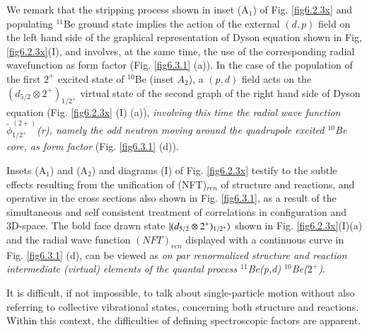   
  We remark that  the stripping process shown in inset
  (A$_1$) of Fig. \ref{fig6.2.3x} and populating $^{11}$Be ground state  implies the action of
  the external $(d,p)$ field on the left hand side of the graphical representation of Dyson equation shown in Fig, 
  \ref{fig6.2.3x}(I), and involves, at the same time, the use of the corresponding radial wavefunction
  as form factor (Fig. \ref{fig6.3.1} (a)). 
  In the case of the population of the first $2^+$ excited state of $^{10}$Be (inset $A_2$), a $(p,d)$ field acts on the 
  $(d_{5/2} \otimes 2^+)_{1/2^+}$ virtual state of the second graph of the right hand side   of Dyson equation
  (Fig. \ref{fig6.2.3x} (I) (a)), \textit{involving this time the radial wave function 
  $\tilde \phi^{(2+)}_{1/2^+}$(r), namely the odd neutron moving around the quadrupole excited $^{10}$Be core,  as  form factor} (Fig. \ref{fig6.3.1} (d)). 
  
  
  Insets 
  (A$_1$) and (A$_2$)  and diagrams (I) of Fig. \ref{fig6.2.3x} testify to the subtle effects resulting  from the unification of (NFT)$_{ren}$ of structure 
  and reactions, and operative in the cross sections   also shown in Fig. \ref{fig6.3.1}, as a result of the 
  simultaneous and self consistent treatment of correlations in configuration and 3D-space.  The bold face drawn state $|{(d_{5/2} \otimes 2^+)_{1/2^+}} \rangle$ shown in Fig. \ref{fig6.2.3x}(I)(a) 
  and the radial  wave function $(NFT)_{ren}$ displayed with a continuous curve in Fig. \ref{fig6.3.1} (d), can be viewed as {\it on par renormalized structure and reaction 
  intermediate (virtual) elements of the quantal process $^{11}$Be(p,d) $^{10}$Be($2^+$)}.
  



It is difficult, if not impossible, to talk about single-particle motion without also referring to collective vibrational states,  concerning both structure and reactions. Within this context, the difficulties of defining spectroscopic factors are apparent.
